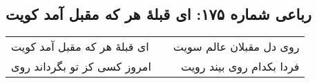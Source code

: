 \begin{center}
\section*{رباعی شماره ۱۷۵: ای قبلهٔ هر که مقبل آمد کویت}
\label{sec:sh175}
\begin{longtable}{l p{0.5cm} r}
ای قبلهٔ هر که مقبل آمد کویت
&&
روی دل مقبلان عالم سویت
\\
امروز کسی کز تو بگرداند روی
&&
فردا بکدام روی بیند رویت
\\
\end{longtable}
\end{center}
